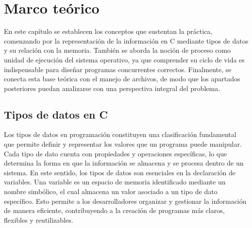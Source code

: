 %
%
\chapter{Marco teórico}

En este capítulo se establecen los conceptos que sustentan la práctica, comenzando por la representación de la información en C mediante tipos de datos y su relación con la memoria. También se aborda la noción de proceso como unidad de ejecución del sistema operativo, ya que comprender su ciclo de vida es indispensable para diseñar programas concurrentes correctos. Finalmente, se conecta esta base teórica con el manejo de archivos, de modo que los apartados posteriores puedan analizarse con una perspectiva integral del problema.


\section{Tipos de datos en C}
\label{sec:tipos_de_datos}




Los tipos de datos en programación constituyen una clasificación fundamental que permite definir y representar los valores que un programa puede manipular. Cada tipo de dato cuenta con propiedades y operaciones específicas, lo que determina la forma en que la información se almacena y se procesa dentro de un sistema. En este sentido, los tipos de datos son esenciales en la declaración de variables. Una variable es un espacio de memoria identificado mediante un nombre simbólico, el cual almacena un valor asociado a un tipo de dato específico. Esto permite a los desarrolladores organizar y gestionar la información de manera eficiente, contribuyendo a la creación de programas más claros, flexibles y reutilizables.

